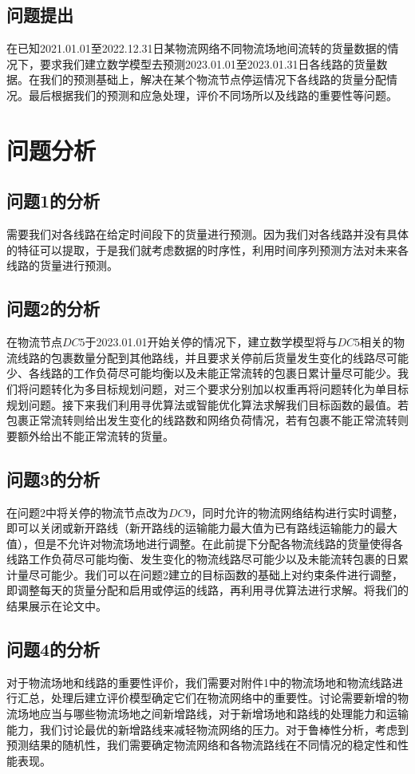 \documentclass{MathorCupmodeling}
\begin{document}
\subsection{问题提出}
在已知2021.01.01至2022.12.31日某物流网络不同物流场地间流转的货量数据的情况下，要求我们建立数学模型去预测2023.01.01至2023.01.31日各线路的货量数据。在我们的预测基础上，解决在某个物流节点停运情况下各线路的货量分配情况。最后根据我们的预测和应急处理，评价不同场所以及线路的重要性等问题。

	\section{问题分析}

	\subsection{问题1的分析}
	需要我们对各线路在给定时间段下的货量进行预测。因为我们对各线路并没有具体的特征可以提取，于是我们就考虑数据的时序性，利用时间序列预测方法对未来各线路的货量进行预测。
	\subsection{问题2的分析}
	在物流节点$DC5$于2023.01.01开始关停的情况下，建立数学模型将与$DC5$相关的物流线路的包裹数量分配到其他路线，并且要求关停前后货量发生变化的线路尽可能少、各线路的工作负荷尽可能均衡以及未能正常流转的包裹日累计量尽可能少。我们将问题转化为多目标规划问题，对三个要求分别加以权重再将问题转化为单目标规划问题。接下来我们利用寻优算法或智能优化算法求解我们目标函数的最值。若包裹正常流转则给出发生变化的线路数和网络负荷情况，若有包裹不能正常流转则要额外给出不能正常流转的货量。
	\subsection{问题3的分析}
	在问题2中将关停的物流节点改为$DC9$，同时允许的物流网络结构进行实时调整，即可以关闭或新开路线（新开路线的运输能力最大值为已有路线运输能力的最大值），但是不允许对物流场地进行调整。在此前提下分配各物流线路的货量使得各线路工作负荷尽可能均衡、发生变化的物流线路尽可能少以及未能流转包裹的日累计量尽可能少。我们可以在问题2建立的目标函数的基础上对约束条件进行调整，即调整每天的货量分配和启用或停运的线路，再利用寻优算法进行求解。将我们的结果展示在论文中。
	\subsection{问题4的分析}
	对于物流场地和线路的重要性评价，我们需要对附件1中的物流场地和物流线路进行汇总，处理后建立评价模型确定它们在物流网络中的重要性。讨论需要新增的物流场地应当与哪些物流场地之间新增路线，对于新增场地和路线的处理能力和运输能力，我们讨论最优的新增路线来减轻物流网络的压力。对于鲁棒性分析，考虑到预测结果的随机性，我们需要确定物流网络和各物流路线在不同情况的稳定性和性能表现。
\end{document}
